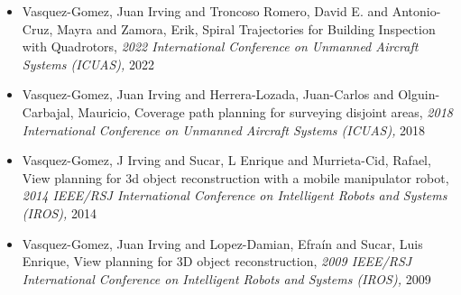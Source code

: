 \begin{itemize} 
\item Vasquez-Gomez, Juan Irving and Troncoso Romero, David E. and Antonio-Cruz, Mayra and Zamora, Erik, Spiral Trajectories for Building Inspection with Quadrotors, \textit{ 2022 International Conference on Unmanned Aircraft Systems (ICUAS),} 2022 
\item Vasquez-Gomez, Juan Irving and Herrera-Lozada, Juan-Carlos and Olguin-Carbajal, Mauricio, Coverage path planning for surveying disjoint areas, \textit{ 2018 International Conference on Unmanned Aircraft Systems (ICUAS),} 2018 
\item Vasquez-Gomez, J Irving and Sucar, L Enrique and Murrieta-Cid, Rafael, View planning for 3d object reconstruction with a mobile manipulator robot, \textit{ 2014 IEEE/RSJ International Conference on Intelligent Robots and Systems (IROS),} 2014 
\item Vasquez-Gomez, Juan Irving and Lopez-Damian, Efraín and Sucar, Luis Enrique, View planning for 3D object reconstruction, \textit{ 2009 IEEE/RSJ International Conference on Intelligent Robots and Systems (IROS),} 2009 
\end{itemize} 
